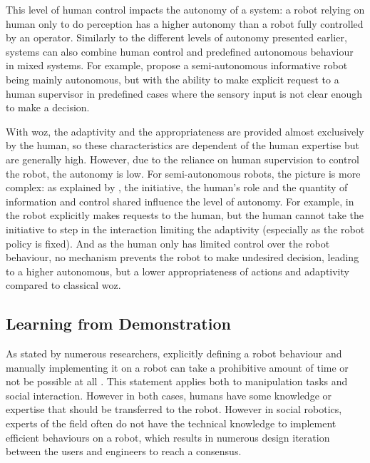 	This level of human control impacts the autonomy of a system: a robot relying on human only to do perception has a higher autonomy than a robot fully controlled by an operator. Similarly to the different levels of autonomy presented earlier, systems can also combine human control and predefined autonomous behaviour in mixed systems. For example, \citet{shiomi2008semi} propose a semi-autonomous informative robot being mainly autonomous, but with the ability to make explicit request to a human supervisor in predefined cases where the sensory input is not clear enough to make a decision. %
	
	With \gls{woz}, the adaptivity and the appropriateness are provided almost exclusively by the human, so these characteristics are dependent of the human expertise but are generally high. However, due to the reliance on human supervision to control the robot, the autonomy is low. For semi-autonomous robots, the picture is more complex: as explained by \cite{beer2014toward}, the initiative, the human's role and the quantity of information and control shared influence the level of autonomy. For example, in \citet{shiomi2008semi} the robot explicitly makes requests to the human, but the human cannot take the initiative to step in the interaction limiting the adaptivity (especially as the robot policy is fixed). And as the human only has limited control over the robot behaviour, no mechanism prevents the robot to make undesired decision, leading to a higher autonomous, but a lower appropriateness of actions and adaptivity compared to classical \gls{woz}.

\subsection{Learning from Demonstration} \label{ssec:back_lfd}
	As stated by numerous researchers, explicitly defining a robot behaviour and manually implementing it on a robot can take a prohibitive amount of time or not be possible at all \citep{argall2009survey,billard2008robot}. This statement applies both to manipulation tasks and social interaction. However in both cases, humans have some knowledge or expertise that should be transferred to the robot. However in social robotics, experts of the field often do not have the technical knowledge to implement efficient behaviours on a robot, which results in numerous design iteration between the users and engineers to reach a consensus. 
	
